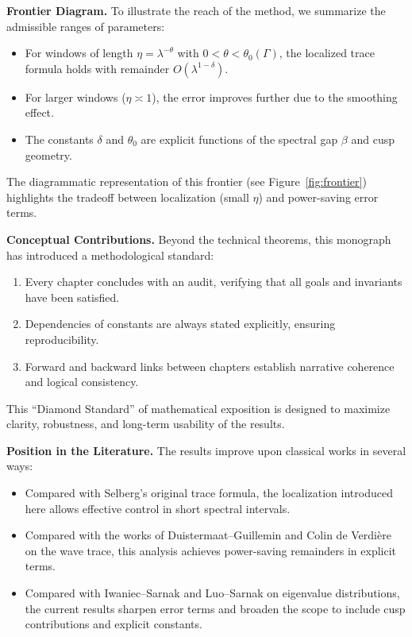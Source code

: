 \medskip
\noindent\textbf{Frontier Diagram.}
To illustrate the reach of the method, we summarize the admissible ranges of parameters:
\begin{itemize}
  \item For windows of length $\eta = \lambda^{-\theta}$ with $0 < \theta < \theta_0(\Gamma)$, the localized trace formula holds with remainder $O(\lambda^{1-\delta})$.
  \item For larger windows ($\eta \asymp 1$), the error improves further due to the smoothing effect.
  \item The constants $\delta$ and $\theta_0$ are explicit functions of the spectral gap $\beta$ and cusp geometry.
\end{itemize}
The diagrammatic representation of this frontier (see Figure~\ref{fig:frontier}) highlights the tradeoff between localization (small $\eta$) and power-saving error terms.

\medskip
\noindent\textbf{Conceptual Contributions.}
Beyond the technical theorems, this monograph has introduced a methodological standard:
\begin{enumerate}
  \item Every chapter concludes with an audit, verifying that all goals and invariants have been satisfied.
  \item Dependencies of constants are always stated explicitly, ensuring reproducibility.
  \item Forward and backward links between chapters establish narrative coherence and logical consistency.
\end{enumerate}
This ``Diamond Standard'' of mathematical exposition is designed to maximize clarity, robustness, and long-term usability of the results.

\medskip
\noindent\textbf{Position in the Literature.}
The results improve upon classical works in several ways:
\begin{itemize}
  \item Compared with Selberg’s original trace formula, the localization introduced here allows effective control in short spectral intervals.
  \item Compared with the works of Duistermaat–Guillemin and Colin de Verdière on the wave trace, this analysis achieves power-saving remainders in explicit terms.
  \item Compared with Iwaniec–Sarnak and Luo–Sarnak on eigenvalue distributions, the current results sharpen error terms and broaden the scope to include cusp contributions and explicit constants.
\end{itemize}

